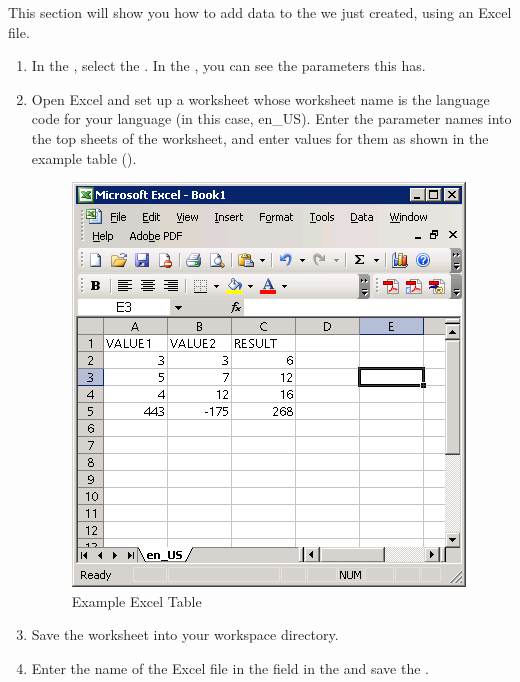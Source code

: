 This section will show you how to add data to the \gdcase{} we just created, using an Excel file. 
\begin{enumerate}
\item In the \gdtestcaseeditor{}, select the  \gdcase{}. In the \gdpropview{}, you can see the parameters this \gdcase{} has. 
\item Open Excel and set up a worksheet whose worksheet name is the language code for your \gdaut{} language (in this case, en\_US). Enter the parameter names into the top sheets of the worksheet, and enter values for them as shown in the example table ().

\begin{figure}[h]
\begin{center}
\includegraphics{Tutorials/PS/TutExcelTable}
\caption{Example Excel Table}
\label{TutExcelTable}
\end{center}
\end{figure}

\item Save the worksheet into your workspace directory. 
\item  Enter the name of the Excel file in the  field in the \gdpropview{} and save the \gdcase{}. 

\end{enumerate}
